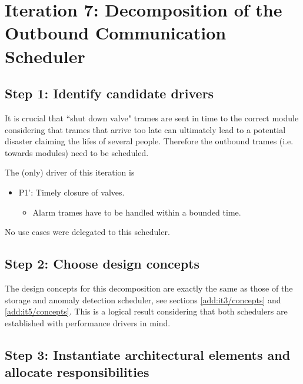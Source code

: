 \section{Iteration 7: Decomposition of the Outbound Communication Scheduler}
\label{add:it7}

\subsection{Step 1: Identify candidate drivers}
\label{add:it7/drivers}

\npar It is crucial that ``shut down valve" trames are sent in time to the
correct module considering that trames that arrive too late can ultimately
lead to a potential disaster claiming the lifes of several people. Therefore the
outbound trames (i.e. towards modules) need to be scheduled. 

\npar The (only) driver of this iteration is 

\begin{itemize}
  	\item P1': Timely closure of valves.
  	\begin{itemize}
  		\item Alarm trames have to be handled within a bounded time. 
    \end{itemize}
\end{itemize}

\npar No use cases were delegated to this scheduler.

\subsection{Step 2: Choose design concepts}
\label{add:it7/concepts}

\npar The design concepts for this decomposition are exactly the same as those
of the storage and anomaly detection scheduler, see sections
\ref{add:it3/concepts} and \ref{add:it5/concepts}.
This is a logical result considering that both schedulers are established with
performance drivers in mind.

\subsection{Step 3: Instantiate architectural elements and allocate responsibilities}
\label{add:it7/elements}

